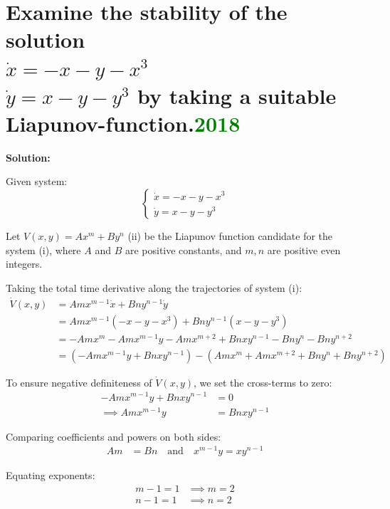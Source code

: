 \section{Examine the stability of the solution\\
$\dot{x} = -x - y - x^3$\\
$\dot{y} = x - y - y^3$
by taking a suitable Liapunov-function.\textcolor{green}{2018}}
\textbf{Solution:}

Given system:
\begin{equation}
\begin{cases}
    \dot{x} = -x - y - x^3 \\
    \dot{y} = x - y - y^3
\end{cases}
\end{equation}

Let $V(x, y) = A x^m + B y^n$ \quad (ii) be the Liapunov function candidate for the system (i), where $A$ and $B$ are positive constants, and $m, n$ are positive even integers.

Taking the total time derivative along the trajectories of system (i):
\begin{align*}
    \dot{V}(x, y) &= A m x^{m-1} \dot{x} + B n y^{n-1} \dot{y} \\
    &= A m x^{m-1}(-x - y - x^3) + B n y^{n-1}(x - y - y^3) \\
    &= -A m x^m - A m x^{m-1} y - A m x^{m+2} + B n x y^{n-1} - B n y^n - B n y^{n+2} \\
    &= \left(-A m x^{m-1} y + B n x y^{n-1}\right) - \left(A m x^m + A m x^{m+2} + B n y^n + B n y^{n+2}\right)
\end{align*}

To ensure negative definiteness of $\dot{V}(x, y)$, we set the cross-terms to zero:
\begin{align*}
    -A m x^{m-1} y + B n x y^{n-1} &= 0 \\
    \implies A m x^{m-1} y &= B n x y^{n-1}
\end{align*}

Comparing coefficients and powers on both sides:
\begin{align}
    A m &= B n \quad \text{and} \quad x^{m-1} y = x y^{n-1}
\end{align}

Equating exponents:
\begin{align*}
    m - 1 = 1 &\implies m = 2 \\
    n - 1 = 1 &\implies n = 2
\end{align*}


